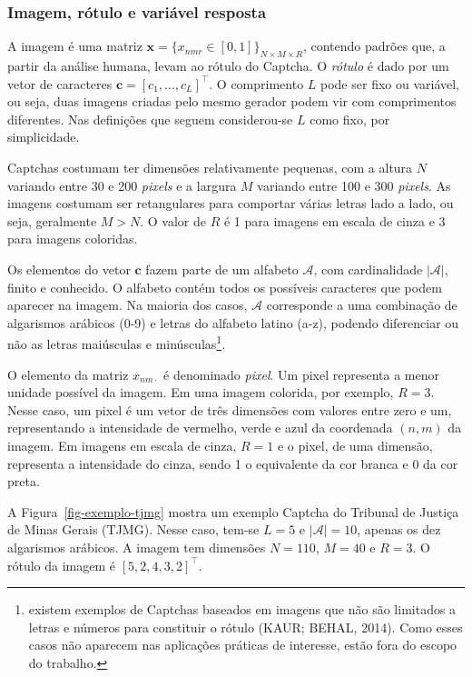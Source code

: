 \documentclass[12pt,twoside,brazilian]{book}
\begin{document}
\hypertarget{imagem-ruxf3tulo-e-variuxe1vel-resposta}{%
\subsubsection{Imagem, rótulo e variável
resposta}\label{imagem-ruxf3tulo-e-variuxe1vel-resposta}}

A imagem é uma matriz
\(\mathbf x = \{x_{nmr} \in [0,1]\}_{N\times M \times R}\), contendo
padrões que, a partir da análise humana, levam ao rótulo do Captcha. O
\emph{rótulo} é dado por um vetor de caracteres
\(\mathbf c = [c_1,\dots,c_L]^\top\). O comprimento \(L\) pode ser fixo
ou variável, ou seja, duas imagens criadas pelo mesmo gerador podem vir
com comprimentos diferentes. Nas definições que seguem considerou-se
\(L\) como fixo, por simplicidade.

Captchas costumam ter dimensões relativamente pequenas, com a altura
\(N\) variando entre 30 e 200 \emph{pixels} e a largura \(M\) variando
entre 100 e 300 \emph{pixels}. As imagens costumam ser retangulares para
comportar várias letras lado a lado, ou seja, geralmente \(M > N\). O
valor de \(R\) é 1 para imagens em escala de cinza e 3 para imagens
coloridas.

Os elementos do vetor \(\mathbf c\) fazem parte de um alfabeto
\(\mathcal A\), com cardinalidade \(|\mathcal A|\), finito e conhecido.
O alfabeto contém todos os possíveis caracteres que podem aparecer na
imagem. Na maioria dos casos, \(\mathcal A\) corresponde a uma
combinação de algarismos arábicos (0-9) e letras do alfabeto latino
(a-z), podendo diferenciar ou não as letras maiúsculas e
minúsculas\footnote{existem exemplos de Captchas baseados em imagens que
  não são limitados a letras e números para constituir o rótulo (KAUR;
  BEHAL, 2014). Como esses casos não aparecem nas aplicações práticas de
  interesse, estão fora do escopo do trabalho.}.

O elemento da matriz \(x_{nm\cdot}\) é denominado \emph{pixel}. Um pixel
representa a menor unidade possível da imagem. Em uma imagem colorida,
por exemplo, \(R=3\). Nesse caso, um pixel é um vetor de três dimensões
com valores entre zero e um, representando a intensidade de vermelho,
verde e azul da coordenada \((n, m)\) da imagem. Em imagens em escala de
cinza, \(R=1\) e o pixel, de uma dimensão, representa a intensidade do
cinza, sendo 1 o equivalente da cor branca e 0 da cor preta.

A Figura~\ref{fig-exemplo-tjmg} mostra um exemplo Captcha do Tribunal de
Justiça de Minas Gerais (TJMG). Nesse caso, tem-se \(L=5\) e
\(|\mathcal A|=10\), apenas os dez algarismos arábicos. A imagem tem
dimensões \(N=110\), \(M=40\) e \(R=3\). O rótulo da imagem é
\([5,2,4,3,2]^\top\).
\end{document}
